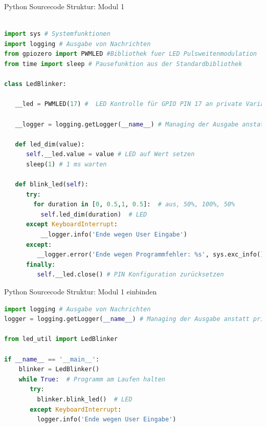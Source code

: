 \begin{frame}[fragile]{Python Sourcecode Struktur: Modul 1}
\begin{lstlisting}[language=Python]

import sys # Systemfunktionen
import logging # Ausgabe von Nachrichten
from gpiozero import PWMLED #Bibliothek fuer LED Pulsweitenmodulation
from time import sleep # Pausefunktion aus der Standardbibliothek

class LedBlinker:
	 
   __led = PWMLED(17) #  LED Kontrolle für GPIO PIN 17 an private Variable zuweisen
   
   __logger = logging.getLogger(__name__) # Managing der Ausgabe anstatt print() Funktion
   
   def led_dim(value):
      self.__led.value = value # LED auf Wert setzen
      sleep(1) # 1 ms warten
   
   def blink_led(self):
      try:
        for duration in [0, 0.5,1, 0.5]:  # aus, 50%, 100%, 50%
          self.led_dim(duration)  # LED     
      except KeyboardInterrupt:  
          __logger.info('Ende wegen User Eingabe')
      except:  
         __logger.error('Ende wegen Programmfehler: %s', sys.exc_info()[0]) # siehe https://docs.python.org/3/tutorial/errors.html
      finally:  
         self.__led.close() # PIN Konfiguration zurücksetzen

\end{lstlisting}
\end{frame}


\begin{frame}[fragile]{Python Sourcecode Struktur: Modul 1 einbinden}
\begin{lstlisting}[language=Python]
import logging # Ausgabe von Nachrichten
logger = logging.getLogger(__name__) # Managing der Ausgabe anstatt print() Funktion

from led_util import LedBlinker

if __name__ == '__main__':
    blinker = LedBlinker()
    while True:  # Programm am Laufen halten
       try:
         blinker.blink_led()  # LED 
       except KeyboardInterrupt:  
         logger.info('Ende wegen User Eingabe')

\end{lstlisting}
\end{frame}



